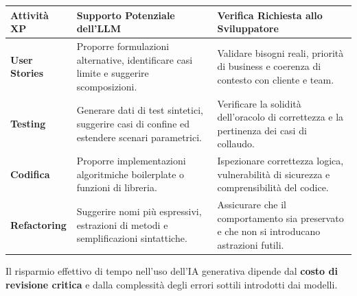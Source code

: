 \documentclass[12pt]{extarticle}
\begin{document}
\begin{center}
\small
\begin{tabular}{p{2.6cm}p{6.0cm}p{5.8cm}}
    \toprule
    \textbf{Attività XP} & \textbf{Supporto Potenziale dell'LLM} & \textbf{Verifica Richiesta allo Sviluppatore} \\
    \midrule
    \textbf{User Stories} & Proporre formulazioni alternative, identificare casi limite e suggerire scomposizioni. & Validare bisogni reali, priorità di business e coerenza di contesto con cliente e team. \\
    \addlinespace
    \textbf{Testing} & Generare dati di test sintetici, suggerire casi di confine ed estendere scenari parametrici. & Verificare la solidità dell'oracolo di correttezza e la pertinenza dei casi di collaudo. \\
    \addlinespace
    \textbf{Codifica} & Proporre implementazioni algoritmiche boilerplate o funzioni di libreria. & Ispezionare correttezza logica, vulnerabilità di sicurezza e comprensibilità del codice. \\
    \addlinespace
    \textbf{Refactoring} & Suggerire nomi più espressivi, estrazioni di metodi e semplificazioni sintattiche. & Assicurare che il comportamento sia preservato e che non si introducano astrazioni futili. \\
    \bottomrule
\end{tabular}
\end{center}

\noindent Il risparmio effettivo di tempo nell'uso dell'IA generativa dipende dal \textbf{costo di revisione critica} e dalla complessità degli errori sottili introdotti dai modelli.
\end{document}
